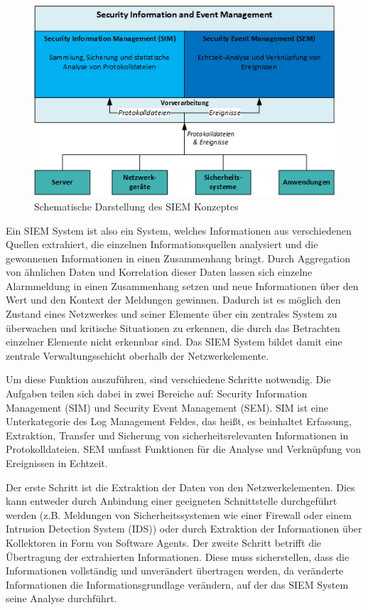 \begin{figure}[h]
\centering
\includegraphics[width=125mm]{Zeichnungen/SIEMKonzept.png}
\caption{Schematische Darstellung des SIEM Konzeptes}
\label{fig:SIEMKonzept}
\end{figure}
Ein SIEM System ist also ein System, welches Informationen aus verschiedenen Quellen extrahiert, die einzelnen Informationsquellen analysiert und die gewonnenen Informationen in einen Zusammenhang bringt. Durch Aggregation von ähnlichen Daten und Korrelation dieser Daten lassen sich einzelne Alarmmeldung in einen Zusammenhang setzen und neue Informationen über den Wert und den Kontext der Meldungen gewinnen. Dadurch ist es möglich den Zustand eines Netzwerkes und seiner Elemente über ein zentrales System zu überwachen und kritische Situationen zu erkennen, die durch das Betrachten einzelner Elemente nicht erkennbar sind. Das SIEM System bildet damit eine zentrale Verwaltungsschicht oberhalb der Netzwerkelemente.

Um diese Funktion auszuführen, sind verschiedene Schritte notwendig. Die Aufgaben teilen sich dabei in zwei Bereiche auf: Security Information Management (SIM) und Security Event Management (SEM). SIM ist eine Unterkategorie des Log Management Feldes, das heißt, es beinhaltet Erfassung, Extraktion, Transfer und Sicherung von sicherheitsrelevanten Informationen in Protokolldateien. SEM umfasst Funktionen für die Analyse und Verknüpfung von Ereignissen in Echtzeit.

Der erste Schritt ist die Extraktion der Daten von den Netzwerkelementen. Dies kann entweder durch Anbindung einer geeigneten Schnittstelle durchgeführt werden (z.B. Meldungen von Sicherheitssystemen wie einer Firewall oder einem Intrusion Detection System (IDS)) oder durch Extraktion der Informationen über Kollektoren in Form von Software Agents. Der zweite Schritt betrifft die Übertragung der extrahierten Informationen. Diese muss sicherstellen, dass die Informationen vollständig und unverändert übertragen werden, da veränderte Informationen die Informationsgrundlage verändern, auf der das SIEM System seine Analyse durchführt. 


